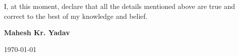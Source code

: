 
\begin{cvparagraph}

I, at this moment, declare that all the details mentioned above are true and correct to the best of my knowledge
and belief.
   
\hfill \textbf{Mahesh Kr. Yadav}
\begin{flushright}
\today
\end{flushright}
\end{cvparagraph}
